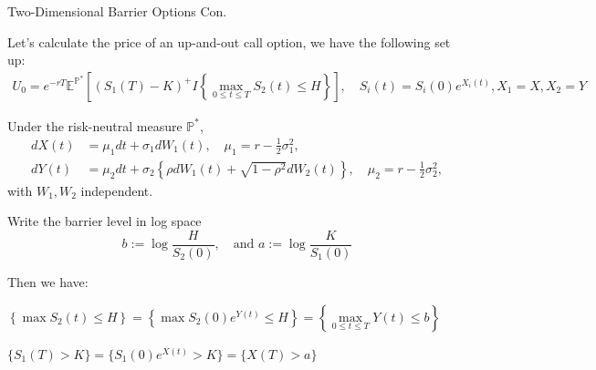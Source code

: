 \documentclass{beamer}
\begin{document}
\begin{frame}{Two-Dimensional Barrier Options Con.}

    {\footnotesize \footnotesize
    \par Let's calculate the price of an up-and-out call option, we have the following set up:
    {\footnotesize \scriptsize
    \begin{align*}
        U_0 = e^{-rT} \mathbb{E}^{\mathbb{P}^*}\left[ (S_1(T) - K)^+ 
       I{\left\{ \max_{0 \leq t \leq T} S_2(t) \leq H \right\}} \right], \quad S_i(t) = S_i(0)e^{X_i(t)}, X_1 
        = X,  X_2 = Y
    \end{align*}
    }\pause
    \par Under the risk-neutral measure \(\mathbb{P}^*\),
    {\footnotesize \scriptsize
    \begin{align*}
    dX(t) &= \mu_1 dt + \sigma_1 dW_1(t), \quad \mu_1 = r - \frac{1}{2} \sigma_1^2, \\
    dY(t) &= \mu_2 dt + \sigma_2 \left\{\rho dW_1(t) + \sqrt{1 - \rho^2} dW_2(t)\right\}, \quad \mu_2 = r - \frac{1}{2} \sigma_2^2,
    \end{align*}
    }
    with \(W_1, W_2\) independent.
    \par Write the barrier level in log space
    \[
    b := \log \frac{H}{S_2(0)}, \quad \text{and } a := \log \frac{K}{S_1(0)}
    \]\pause
    \par Then we have:\\
    {\footnotesize \scriptsize
    \begin{center}
        $\left\{ \max S_2(t) \leq H \right\} = \left\{ \max S_2(0)e^{Y(t)} \leq H \right\}
         = \left\{ \max\limits_{0 \leq t \leq T} Y(t) \leq b \right\}$
    \end{center}
     \begin{center}
        $\{S_1(T) > K\} = \{S_1(0)e^{X(t)} > K\} = \{X(T) > a\}$
    \end{center}
    }
    
    }
    
\end{frame}
\end{document}

